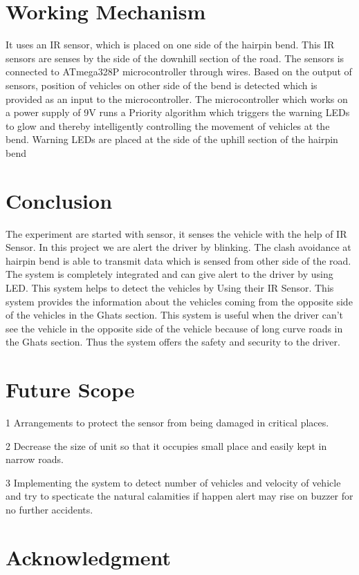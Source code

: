 \documentclass[conference]{IEEEtran}
\begin{document}
    \section{Working Mechanism}
    It uses an IR sensor, which is
    placed on one side of the hairpin bend. This IR sensors
    are senses by the side of the downhill section of the road.
    The sensors is connected to
    ATmega328P microcontroller through wires. Based on the
    output of sensors, position of vehicles on other side of the
    bend is detected which is provided as an input to the
    microcontroller. The microcontroller which works on a
    power supply of 9V runs a Priority algorithm which triggers
    the warning LEDs to glow and thereby intelligently
    controlling the movement of vehicles at the bend. Warning
    LEDs are placed at the side of the uphill section of the
    hairpin bend

    \section{Conclusion}
    The experiment are started with sensor, it senses the vehicle
    with the help of IR Sensor. In this project we are alert the
    driver by blinking. The clash avoidance at hairpin bend is
    able to transmit data which is sensed from other side of the
    road. The system is completely integrated and can give alert
    to the driver by using LED. This system helps to detect the
    vehicles by Using their IR Sensor. This system provides the
    information about the vehicles coming from the opposite side of the vehicles in the Ghats section. This system is useful
    when the driver can't see the vehicle in the opposite side of
    the vehicle because of long curve roads in the Ghats section.
    Thus the system offers the safety and security to the driver.
    \section{Future Scope}
    \itemize
    \item[1] Arrangements to protect the sensor from being damaged in critical places.
    \item[2] Decrease the size of unit so that it occupies small place and easily kept in narrow roads.
    \item[3] Implementing the system to detect number of vehicles and velocity of vehicle and try to specticate the natural calamities if
    happen alert may rise on buzzer for no further accidents.
    \section*{Acknowledgment}
\end{document}
